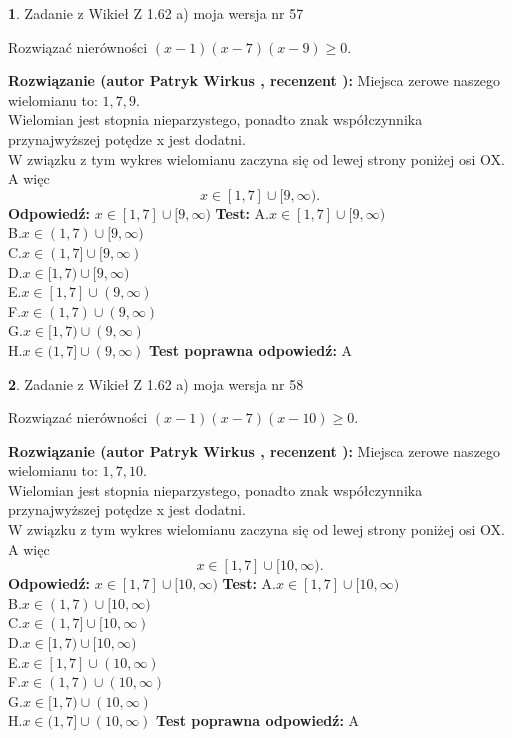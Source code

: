 \documentclass[12pt, a4paper]{article}
\theoremstyle{definition} %
\newtheorem{zad}{}
\newcommand{\zadStart}[1]{\begin{zad}#1\newline}
\newcommand{\zadStop}{\end{zad}}
\newcommand{\rozwStart}[2]{\noindent \textbf{Rozwiązanie (autor #1 , recenzent #2): }\newline}
\newcommand{\rozwStop}{\newline}
\newcommand{\odpStart}{\noindent \textbf{Odpowiedź:}\newline}
\newcommand{\odpStop}{\newline}
\newcommand{\testStart}{\noindent \textbf{Test:}\newline}
\newcommand{\testStop}{\newline}
\newcommand{\kluczStart}{\noindent \textbf{Test poprawna odpowiedź:}\newline}
\newcommand{\kluczStop}{\newline}
\begin{document}
\zadStart{Zadanie z Wikieł Z 1.62 a) moja wersja nr 57}

Rozwiązać nierówności $(x-1)(x-7)(x-9)\ge0$.
\zadStop
\rozwStart{Patryk Wirkus}{}
Miejsca zerowe naszego wielomianu to: $1, 7, 9$.\\
Wielomian jest stopnia nieparzystego, ponadto znak współczynnika przy\linebreak najwyższej potędze x jest dodatni.\\ W związku z tym wykres wielomianu zaczyna się od lewej strony poniżej osi OX. A więc $$x \in [1,7] \cup [9,\infty).$$
\rozwStop
\odpStart
$x \in [1,7] \cup [9,\infty)$
\odpStop
\testStart
A.$x \in [1,7] \cup [9,\infty)$\\
B.$x \in (1,7) \cup [9,\infty)$\\
C.$x \in (1,7] \cup [9,\infty)$\\
D.$x \in [1,7) \cup [9,\infty)$\\
E.$x \in [1,7] \cup (9,\infty)$\\
F.$x \in (1,7) \cup (9,\infty)$\\
G.$x \in [1,7) \cup (9,\infty)$\\
H.$x \in (1,7] \cup (9,\infty)$
\testStop
\kluczStart
A
\kluczStop



\zadStart{Zadanie z Wikieł Z 1.62 a) moja wersja nr 58}

Rozwiązać nierówności $(x-1)(x-7)(x-10)\ge0$.
\zadStop
\rozwStart{Patryk Wirkus}{}
Miejsca zerowe naszego wielomianu to: $1, 7, 10$.\\
Wielomian jest stopnia nieparzystego, ponadto znak współczynnika przy\linebreak najwyższej potędze x jest dodatni.\\ W związku z tym wykres wielomianu zaczyna się od lewej strony poniżej osi OX. A więc $$x \in [1,7] \cup [10,\infty).$$
\rozwStop
\odpStart
$x \in [1,7] \cup [10,\infty)$
\odpStop
\testStart
A.$x \in [1,7] \cup [10,\infty)$\\
B.$x \in (1,7) \cup [10,\infty)$\\
C.$x \in (1,7] \cup [10,\infty)$\\
D.$x \in [1,7) \cup [10,\infty)$\\
E.$x \in [1,7] \cup (10,\infty)$\\
F.$x \in (1,7) \cup (10,\infty)$\\
G.$x \in [1,7) \cup (10,\infty)$\\
H.$x \in (1,7] \cup (10,\infty)$
\testStop
\kluczStart
A
\kluczStop
\end{document}

